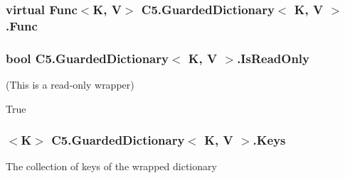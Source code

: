 \hypertarget{class_c5_1_1_guarded_dictionary_a0dc7a885f47a6a2506e46fb813190231}{}
\subsubsection[{Func}]{\setlength{\rightskip}{0pt plus 5cm}virtual Func$<$K, V$>$ {\bf C5.\+Guarded\+Dictionary}$<$ K, V $>$.Func\hspace{0.3cm}{\ttfamily [get]}}\label{class_c5_1_1_guarded_dictionary_a0dc7a885f47a6a2506e46fb813190231}




\hypertarget{class_c5_1_1_guarded_dictionary_a18ce63220c7b6b3e6a569cd321c4da16}{}
\subsubsection[{Is\+Read\+Only}]{\setlength{\rightskip}{0pt plus 5cm}bool {\bf C5.\+Guarded\+Dictionary}$<$ K, V $>$.Is\+Read\+Only\hspace{0.3cm}{\ttfamily [get]}}\label{class_c5_1_1_guarded_dictionary_a18ce63220c7b6b3e6a569cd321c4da16}


(This is a read-\/only wrapper) 

True\hypertarget{class_c5_1_1_guarded_dictionary_a9ebe83dbe1e0e8c93c7d268c3643fba4}{}
\subsubsection[{Keys}]{$<$K$>$ {\bf C5.\+Guarded\+Dictionary}$<$ K, V $>$.Keys\hspace{0.3cm}{\ttfamily [get]}}\label{class_c5_1_1_guarded_dictionary_a9ebe83dbe1e0e8c93c7d268c3643fba4}




The collection of keys of the wrapped dictionary\hypertarget{class_c5_1_1_guarded_dictionary_a721d36a134e3aa6ff2c92cf6bffb9fb3}{}
